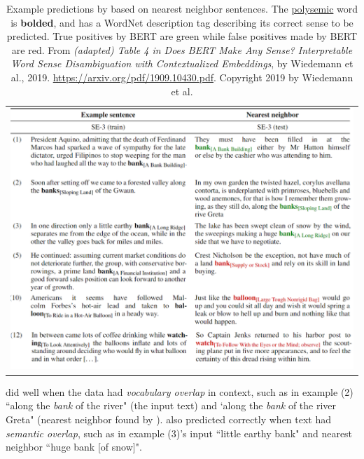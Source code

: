 \begin{table}[ht!]
  \centering
  \caption{\footnotesize Example predictions by  based on nearest neighbor sentences. The \hyperref[sec:Polysemy]{polysemic} word is \textbf{bolded}, and has a WordNet description tag describing its correct sense to be predicted. {\color{ForestGreen} True positives by BERT are green} while {\color{Red} false positives made by BERT are red}. From \emph{(adapted) Table 4 in Does BERT Make Any Sense? Interpretable Word Sense Disambiguation with Contextualized Embeddings}, by Wiedemann et al., 2019. \url{https://arxiv.org/pdf/1909.10430.pdf}. Copyright 2019 by Wiedemann et al.}
  \begin{tabular}{ c }
    
    \begin{minipage}{.9\textwidth}
      \includegraphics[width=\linewidth]{imgs/table_bertPolysemyTests.png}
    \end{minipage}
    
  \end{tabular}
  \label{tbl:bertPolysemy}
\end{table}



 did well when the data had \emph{vocabulary overlap} in context, such as in example (2) ``along the \emph{bank} of the river" (the input text) and `along the \emph{bank} of the river Greta" (nearest neighbor found by ).  also predicted correctly when text had \emph{semantic overlap}, such as in example (3)'s input ``little earthy bank" and nearest neighbor ``huge bank [of snow]". 


